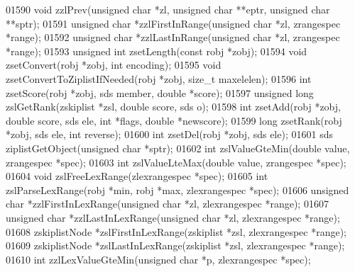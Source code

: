 \begin{DoxyCode}
{{{{{{{01590 \textcolor{keywordtype}{void} zzlPrev(\textcolor{keywordtype}{unsigned} \textcolor{keywordtype}{char} *zl, \textcolor{keywordtype}{unsigned} \textcolor{keywordtype}{char} **eptr, \textcolor{keywordtype}{unsigned} \textcolor{keywordtype}{char} **sptr);
01591 \textcolor{keywordtype}{unsigned} \textcolor{keywordtype}{char} *zzlFirstInRange(\textcolor{keywordtype}{unsigned} \textcolor{keywordtype}{char} *zl, zrangespec *range);
01592 \textcolor{keywordtype}{unsigned} \textcolor{keywordtype}{char} *zzlLastInRange(\textcolor{keywordtype}{unsigned} \textcolor{keywordtype}{char} *zl, zrangespec *range);
01593 \textcolor{keywordtype}{unsigned} \textcolor{keywordtype}{int} zsetLength(\textcolor{keyword}{const} robj *zobj);
01594 \textcolor{keywordtype}{void} zsetConvert(robj *zobj, \textcolor{keywordtype}{int} encoding);
01595 \textcolor{keywordtype}{void} zsetConvertToZiplistIfNeeded(robj *zobj, size\_t maxelelen);
01596 \textcolor{keywordtype}{int} zsetScore(robj *zobj, sds member, \textcolor{keywordtype}{double} *score);
01597 \textcolor{keywordtype}{unsigned} \textcolor{keywordtype}{long} zslGetRank(zskiplist *zsl, \textcolor{keywordtype}{double} score, sds o);
01598 \textcolor{keywordtype}{int} zsetAdd(robj *zobj, \textcolor{keywordtype}{double} score, sds ele, \textcolor{keywordtype}{int} *flags, \textcolor{keywordtype}{double} *newscore);
01599 \textcolor{keywordtype}{long} zsetRank(robj *zobj, sds ele, \textcolor{keywordtype}{int} reverse);
01600 \textcolor{keywordtype}{int} zsetDel(robj *zobj, sds ele);
01601 sds ziplistGetObject(\textcolor{keywordtype}{unsigned} \textcolor{keywordtype}{char} *sptr);
01602 \textcolor{keywordtype}{int} zslValueGteMin(\textcolor{keywordtype}{double} value, zrangespec *spec);
01603 \textcolor{keywordtype}{int} zslValueLteMax(\textcolor{keywordtype}{double} value, zrangespec *spec);
01604 \textcolor{keywordtype}{void} zslFreeLexRange(zlexrangespec *spec);
01605 \textcolor{keywordtype}{int} zslParseLexRange(robj *min, robj *max, zlexrangespec *spec);
01606 \textcolor{keywordtype}{unsigned} \textcolor{keywordtype}{char} *zzlFirstInLexRange(\textcolor{keywordtype}{unsigned} \textcolor{keywordtype}{char} *zl, zlexrangespec *range);
01607 \textcolor{keywordtype}{unsigned} \textcolor{keywordtype}{char} *zzlLastInLexRange(\textcolor{keywordtype}{unsigned} \textcolor{keywordtype}{char} *zl, zlexrangespec *range);
01608 zskiplistNode *zslFirstInLexRange(zskiplist *zsl, zlexrangespec *range);
01609 zskiplistNode *zslLastInLexRange(zskiplist *zsl, zlexrangespec *range);
01610 \textcolor{keywordtype}{int} zzlLexValueGteMin(\textcolor{keywordtype}{unsigned} \textcolor{keywordtype}{char} *p, zlexrangespec *spec);
}}}}}}}
\end{DoxyCode}
